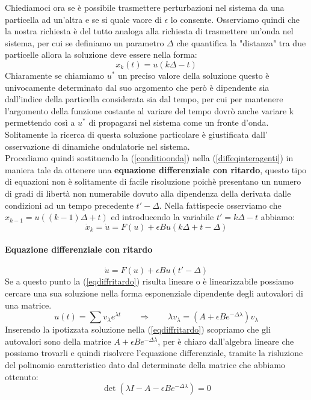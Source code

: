 Chiediamoci ora se è possibile trasmettere perturbazioni nel sistema da una particella ad un'altra e se si quale vaore di $\epsilon$ lo consente. Osserviamo quindi che la nostra richiesta è del tutto analoga alla richiesta di trasmettere un'onda nel sistema, per cui se definiamo un parametro $\Delta$ che quantifica la "distanza" tra due particelle allora la soluzione deve essere nella forma:
\begin{equation}
	x_k(t)=u(k\Delta - t)
	\label{conditioonda}
\end{equation}
Chiaramente se chiamiamo $u^*$ un preciso valore della soluzione questo è univocamente determinato dal suo argomento che però è dipendente sia dall'indice della particella considerata sia dal tempo, per cui per mantenere l'argomento della funzione costante al variare del tempo dovrò anche variare k permettendo così a $u^*$ di propagarsi nel sistema come un fronte d'onda. \\Solitamente la ricerca di questa soluzione particolare è giustificata dall' osservazione di dinamiche ondulatorie nel sistema.\\

Procediamo quindi sostituendo la (\ref{conditioonda}) nella (\ref{diffeqinteragenti}) in maniera tale da ottenere una \textbf{equazione differenziale con ritardo}, questo tipo di equazioni non è solitamente di facile risoluzione poichè presentano un numero di gradi di libertà non numerabile dovuto alla dipendenza della derivata dalle condizioni ad un tempo precedente $t'-\Delta$. Nella fattispecie osserviamo che $x_{k-1}=u((k-1)\Delta+t)$ ed introducendo la variabile $t'=k\Delta-t$ abbiamo:
\begin{equation*}
		\dot{x}_k=\dot{u}=F(u)+\epsilon Bu(k\Delta+t-\Delta)
\end{equation*}
\paragraph{Equazione differenziale con ritardo}
\begin{equation}
	\dot{u}=F(u)+\epsilon Bu(t'-\Delta) \label{eqdiffritardo}
\end{equation}
Se a questo punto la (\ref{eqdiffritardo}) risulta lineare o è linearizzabile possiamo cercare una sua soluzione nella forma esponenziale dipendente degli autovalori di una matrice. 
\begin{equation*}
	u(t)=\sum v_\lambda e^{\lambda t}\qquad \Rightarrow \qquad  \lambda v_\lambda = (A+\epsilon Be^{-\Delta\lambda})v_\lambda
\end{equation*}
Inserendo la ipotizzata soluzione nella (\ref{eqdiffritardo}) scopriamo che gli autovalori sono della matrice $A+\epsilon Be^{-\Delta\lambda}$, per è chiaro dall'algebra lineare che possiamo trovarli e quindi risolvere l'equazione differenziale, tramite la risluzione del polinomio caratteristico dato dal determinate della matrice che abbiamo ottenuto:
\begin{equation}
	\det(\lambda I-A-\epsilon Be^{-\Delta \lambda})=0
\end{equation}


